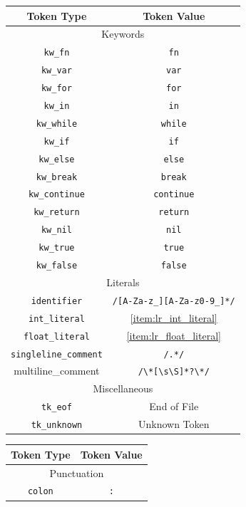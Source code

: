 \documentclass[11pt]{book}
\begin{document}
\begin{table}[H]
  \centering
  \begin{tabular}{|c|c|}
    \hline
    Token Type & Token Value \\ \hline
    \multicolumn{2}{|c|}{Keywords} \\ \hline
    \texttt{kw\_fn} & \texttt{fn} \\
    \texttt{kw\_var} & \texttt{var} \\
    \texttt{kw\_for} & \texttt{for} \\
    \texttt{kw\_in} & \texttt{in} \\
    \texttt{kw\_while} & \texttt{while} \\
    \texttt{kw\_if} & \texttt{if} \\
    \texttt{kw\_else} & \texttt{else} \\
    \texttt{kw\_break} & \texttt{break} \\
    \texttt{kw\_continue} & \texttt{continue} \\
    \texttt{kw\_return} & \texttt{return} \\
    \texttt{kw\_nil} & \texttt{nil} \\
    \texttt{kw\_true} & \texttt{true} \\
    \texttt{kw\_false} & \texttt{false} \\ \hline
    \multicolumn{2}{|c|}{Literals} \\ \hline
    \texttt{identifier} & \texttt{/[A-Za-z\_][A-Za-z0-9\_]*/} \\
    \texttt{int\_literal} & \ref{item:lr_int_literal} \\
    \texttt{float\_literal} & \ref{item:lr_float_literal} \\
    \texttt{singleline\_comment} & \texttt{/\/\/.*/} \\
    multiline\_comment & \verb|/\*[\s\S]*?\*/| \\ \hline
    \multicolumn{2}{|c|}{Miscellaneous} \\ \hline
    \texttt{tk\_eof} & End of File \\
    \texttt{tk\_unknown} & Unknown Token \\
    \hline
  \end{tabular}
  \hspace{1cm}
  \begin{tabular}{|c|c|}
    \hline
    Token Type & Token Value \\ \hline
    \multicolumn{2}{|c|}{Punctuation} \\ \hline
    \texttt{colon} & \texttt{:} \\

\end{tabular}
\end{table}
\end{document}
